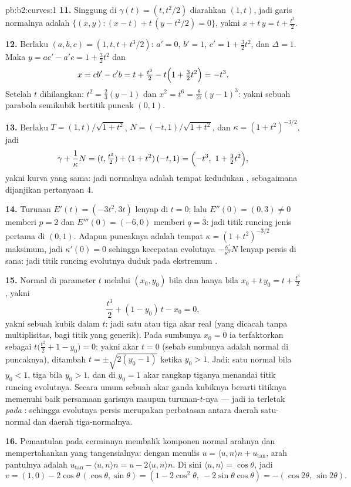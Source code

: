\begin{solution}{pb:b2:curves:1}
\textbf{11.} Singgung di $\gamma(t) = (t, t^2/2)$
diarahkan $(1, t)$, jadi garis normalnya adalah $\{(x, y) : (x -
t) + t\,(y - t^2/2) = 0\}$, yakni $x + t\,y = t +
\tfrac{t^3}2$.

\textbf{12.} Berlaku $(a, b, c) = (1, t, t + t^3/2)$: $a' = 0$, $b' =
1$, $c' = 1 + \tfrac32 t^2$, dan $\Delta = 1$. Maka $y = ac' -
a'c = 1 + \tfrac32t^2$ dan
\[
x = cb' - c'b = t + \tfrac{t^3}2 - t\Bigl(1 +
\tfrac32t^2\Bigr) = -t^3 .
\]
Setelah $t$ dihilangkan: $t^2 = \tfrac23(y - 1)$ dan $x^2 = t^6 =
\tfrac8{27}(y - 1)^3$: yakni sebuah parabola semikubik bertitik puncak
$(0, 1)$.

\textbf{13.} Berlaku $T = (1, t)/\sqrt{1+t^2}$, $N = (-t,
1)/\sqrt{1+t^2}$, dan $\kappa = (1+t^2)^{-3/2}$, jadi
\[
\gamma + \frac1\kappa N = (t, \tfrac{t^2}2) +
(1+t^2)\,(-t, 1) = \Bigl(-t^3,\ 1 + \tfrac32t^2\Bigr),
\]
yakni kurva yang sama: jadi  normalnya adalah tempat kedudukan
, sebagaimana dijanjikan pertanyaan 4.

\textbf{14.} Turunan $E'(t) = (-3t^2, 3t)$ lenyap di $t = 0$;
lalu $E''(0) = (0, 3) \neq 0$ memberi $p = 2$ dan $E'''(0) = (-6,
0)$ memberi $q = 3$: jadi titik runcing jenis pertama di $(0, 1)$. Adapun
puncaknya adalah tempat $\kappa = (1+t^2)^{-3/2}$ maksimum, jadi
$\kappa'(0) = 0$ sehingga kecepatan evolutnya
$-\frac{\kappa'}{\kappa^2}N$ lenyap persis di sana: jadi titik runcing
evolutnya duduk pada ekstremum .

\textbf{15.} Normal di parameter $t$ melalui
$(x_0, y_0)$ bila dan hanya bila $x_0 + t\,y_0 = t + \tfrac{t^3}2$, yakni
\[
\frac{t^3}2 + (1 - y_0)\,t - x_0 = 0 ,
\]
yakni sebuah kubik dalam $t$: jadi satu atau tiga akar real (yang dicacah tanpa
multiplisitas, bagi titik yang generik). Pada sumbunya $x_0 = 0$ ia
terfaktorkan sebagai $t\bigl(\tfrac{t^2}2 + 1 - y_0\bigr) = 0$: yakni
akar $t = 0$ (sebab sumbunya adalah normal di puncaknya), ditambah
$t = \pm\sqrt{2(y_0 - 1)}$ ketika $y_0 > 1$. Jadi: satu normal
bila $y_0 < 1$, tiga bila $y_0 > 1$, dan di $y_0 = 1$
akar rangkap tiganya menandai titik runcing evolutnya. Secara umum sebuah
akar ganda kubiknya berarti titiknya memenuhi baik
persamaan garisnya maupun turunan-$t$-nya --- jadi ia terletak \emph{pada
}: sehingga evolutnya persis merupakan perbatasan antara
daerah satu-normal dan daerah tiga-normalnya.

\textbf{16.} Pemantulan pada cerminnya membalik komponen normal
arahnya dan mempertahankan yang tangensialnya:
dengan menulis $u = \langle u, n\rangle n + u_{\mathrm{tan}}$,
arah pantulnya adalah $u_{\mathrm{tan}} - \langle u,
n\rangle n = u - 2\langle u, n\rangle n$. Di sini $\langle u,
n\rangle = \cos\theta$, jadi
\[
v = (1, 0) - 2\cos\theta\,(\cos\theta, \sin\theta)
= (1 - 2\cos^2\theta,\ -2\sin\theta\cos\theta)
= -(\cos2\theta,\ \sin2\theta).
\]


\end{solution}
